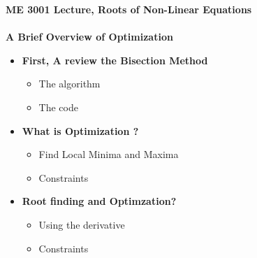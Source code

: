 \documentclass[11pt]{article}
\begin{document}
\textbf{ \LARGE ME 3001 Lecture, Roots of Non-Linear Equations} \\\\
\textbf{ \LARGE A Brief Overview of Optimization} \\

\begin{itemize}

	\item  \textbf{\LARGE First, A review the Bisection Method}
		
		\LARGE
		\begin{itemize}
			\item The algorithm \vspace{80mm}			
			\item The code
		\end{itemize}	
		\newpage

	\item \textbf{\LARGE What is Optimization ?}
		\begin{itemize}
			\item Find Local Minima and Maxima \vspace{80mm}	
			\item Constraints	
		\end{itemize}
		\newpage
		
	\item \textbf{\LARGE Root finding and Optimzation?}
		\begin{itemize}
			\item Using the derivative \vspace{80mm}	
			\item Constraints	
		\end{itemize}
		\newpage


\end{itemize}
\end{document}
